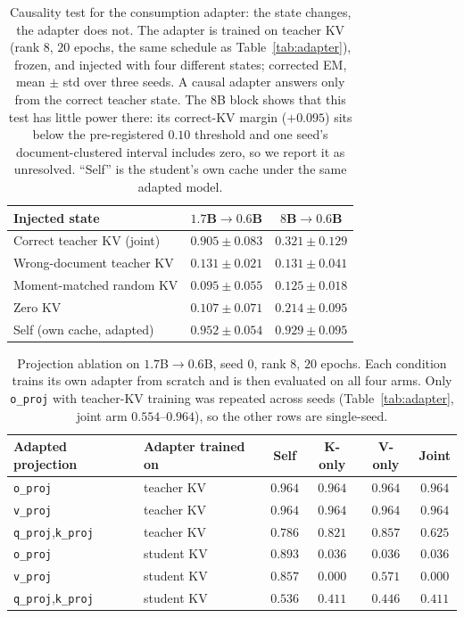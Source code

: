 \documentclass[11pt]{article}
\begin{document}
\begin{table}[t]
\centering
\small
\caption{Causality test for the consumption adapter: the state changes, the
adapter does not. The adapter is trained on teacher KV (rank 8, $20$ epochs, the
same schedule as Table~\ref{tab:adapter}), frozen, and injected with four
different states; corrected EM, mean $\pm$ std over three seeds. A causal adapter
answers only from the correct teacher state. The $8$B block shows that this test
has little power there: its correct-KV margin ($+0.095$) sits below the
pre-registered $0.10$ threshold and one seed's document-clustered interval
includes zero, so we report it as unresolved. ``Self'' is the student's own cache
under the same adapted model.}
\label{tab:causal}
\begin{tabular}{lcc}
\toprule
Injected state & $1.7$B$\to0.6$B & $8$B$\to0.6$B \\
\midrule
Correct teacher KV (joint)        & $\mathbf{0.905{\pm}0.083}$ & $\mathbf{0.321{\pm}0.129}$ \\
Wrong-document teacher KV          & $0.131{\pm}0.021$ & $0.131{\pm}0.041$ \\
Moment-matched random KV           & $0.095{\pm}0.055$ & $0.125{\pm}0.018$ \\
Zero KV                            & $0.107{\pm}0.071$ & $0.214{\pm}0.095$ \\
\midrule
Self (own cache, adapted)          & $0.952{\pm}0.054$ & $0.929{\pm}0.095$ \\
\bottomrule
\end{tabular}
\end{table}

\begin{table}[t]
\centering
\small
\caption{Projection ablation on $1.7$B$\to0.6$B, seed 0, rank 8, $20$ epochs.
Each condition trains its own adapter from scratch and is then evaluated on all
four arms. Only \texttt{o\_proj} with teacher-KV training was repeated across
seeds (Table~\ref{tab:adapter}, joint arm $0.554$--$0.964$), so the other rows are
single-seed.}
\label{tab:ablation}
\begin{tabular}{llcccc}
\toprule
Adapted projection & Adapter trained on & Self & K-only & V-only & Joint \\
\midrule
\texttt{o\_proj} & teacher KV & $0.964$ & $\mathbf{0.964}$ & $\mathbf{0.964}$ & $\mathbf{0.964}$ \\
\texttt{v\_proj} & teacher KV & $0.964$ & $0.964$ & $0.964$ & $0.964$ \\
\texttt{q\_proj},\texttt{k\_proj} & teacher KV & $0.786$ & $0.821$ & $0.857$ & $0.625$ \\
\midrule
\texttt{o\_proj} & student KV & $0.893$ & $0.036$ & $0.036$ & $0.036$ \\
\texttt{v\_proj} & student KV & $0.857$ & $0.000$ & $0.571$ & $0.000$ \\
\texttt{q\_proj},\texttt{k\_proj} & student KV & $0.536$ & $0.411$ & $0.446$ & $0.411$ \\
\bottomrule
\end{tabular}
\end{table}
\end{document}
